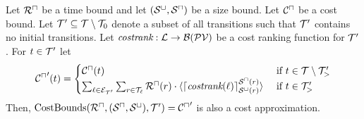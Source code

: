 \begin{theorem}[CostBounds]
  Let ${\mathcal{R}^\sqcap}$ be a time bound and let ${({\mathcal{S}^\sqcup}, {\mathcal{S}^\sqcap})}$ be a size bound.
  Let ${\mathcal{C}^\sqcap}$ be a cost bound.
  Let $\mathcal{T}' \subseteq \mathcal{T} \setminus \mathcal{T}_0$ denote a subset of all transitions such that $\mathcal{T}'$ contains no initial transitions.
  Let $\emph{costrank}: \mathcal{L} \rightarrow \mathcal{B}(\mathcal{PV})$ be a cost ranking function for $\mathcal{T}'$.
  For $t \in \mathcal{T}'$ let
  \[ {\mathcal{C}^\sqcap}'(t) = 
  \begin{cases}
    {\mathcal{C}^\sqcap}(t) & \text{ if } t \in \mathcal{T} \setminus \mathcal{T}'_> \\
    \sum_{\ell \in \mathcal{E}_{\mathcal{T}'}} \sum_{r \in \mathcal{T}_\ell} {\mathcal{R}^\sqcap}(r) \cdot \langle\lceil \emph{costrank}(\ell) \rceil^{{\mathcal{S}^\sqcap}(r)}_{{\mathcal{S}^\sqcup}(r)}\rangle & \text{ if } t \in \mathcal{T}'_>
  \end{cases}
  \]
  Then, $\text{CostBounds}({\mathcal{R}^\sqcap}, ({\mathcal{S}^\sqcap}, {\mathcal{S}^\sqcup}), \mathcal{T}') = {\mathcal{C}^\sqcap}'$ is also a cost approximation.
\end{theorem}
